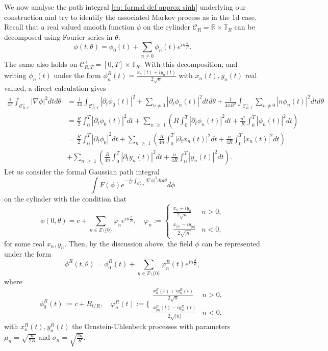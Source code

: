 \documentclass[11pt]{amsart}
\numberwithin{equation}{section}
\theoremstyle{definition}
\renewcommand{\geq}{\;\geqslant\;}                   %
\newcommand{\R}{\mathbb{R}}
\newcommand{\Z}{\mathbb{Z}}
\newcommand{\pl}{\partial}
\newcommand{\mc}{\mathcal}
\def\T{\mathbb{T}}
\begin{document}
We now analyse the path integral \eqref{eq: formal def approx sinh} underlying our construction and try to identify the associated Markov process as in the 1d case. Recall that a real valued smooth function $\phi$ on the cylinder $\mc{C}_R=\R\times \T_R$ can be decomposed using Fourier series in $\theta$:
\begin{equation}
\phi(t, \theta)= \phi_0(t)+ \sum_{n \not = 0} \phi_{n}(t) e^{i n \frac{\theta}{R}}. 
\end{equation}
The same also holds on $\mc{C}^+_{R,T}=[0,T]\times \T_R$. 
With this decomposition, and writing $\phi_{n}(t)$ under the form $\phi^R_{n}(t) = \frac{x_n(t)+i y_n(t)}{2 \sqrt{n}}$ with $x_n(t),y_n(t)$ real valued, a direct calculation gives
\begin{align*}
\frac {1} {4 \pi} \int_{\mc{C}^+_{R,T}}  |\nabla \phi|^2 dtd\theta & =   \frac {1} {4 \pi}   \int_{\mc{C}^+_{R,T}}  |\pl_t\phi_0(t)|^2 + \sum_{n \not = 0} |\pl_t \phi_{n}(t)|^2 dt d\theta +  \frac {1} {4 \pi R^2}  \int_{\mc{C}^+_{R,T}}   \sum_{n \not = 0}  |n \phi_n(t)|^2 dt d\theta \\
& = \frac {R} {2}   \int_{0}^T  |\pl_t\phi_0(t)|^2 dt +  \sum_{n \geq 1} \left ( R  \int_{0}^T   |\pl_t\phi_n(t)|^2 dt  
+  \frac{n^2}{R} \int_{0}^T  |\phi_n(t)|^2 dt \right )\\
& =  \frac {R} {2}   \int_{0}^T  |\pl_t\phi_0|^2 dt +\sum_{n \geq 1} \left (\frac{R}{4 n}  \int_{0}^T   |\pl_tx_n(t)  |^2 dt  +    \frac{n}{4R} \int_{0}^T     |  x_n(t) |^2 dt \right )  \\
& +\sum_{n \geq 1} \left ( \frac {R} {4n} \int_{0}^T   |\pl_t y_n(t)|^2 dt  +  \frac{ n }{4R}  \int_{0}^T  |  y_n(t) |^2 dt \right ).
\end{align*}
Let us consider the formal Gaussian path integral 
\[ \int F(\phi)e^{-\frac{1}{4\pi} \int_{\mc{C}^+_{R,T}}  |\nabla \phi|^2dtd\theta}d\phi\]
on the cylinder with the condition that 
\[\phi(0,\theta)=c+\sum_{n\in \Z\setminus \{0\}}\varphi_ne^{in\frac{\theta}{R}}, \quad 
\varphi_n:=\left\{\begin{array}{ll}
\frac{x_n+iy_n}{2\sqrt{n}} & n>0,\\
\frac{x_{|n|}-iy_{|n|}}{2\sqrt{|n|}} & n<0,
\end{array}\right.\]
for some real $x_n,y_n$. Then, by the discussion above,
the field $\phi$ can be represented under the form 
\[ \phi^R(t,\theta)=\phi_0^R(t)+\sum_{n\in \Z\setminus \{0\}}\varphi_n^R(t)e^{in\frac{\theta}{R}},\] 
where 
\[\phi_0^R(t):=c+B_{t/R}, \quad  \varphi^R_n(t):=\Bigg\{\begin{array}{ll}
\frac{x_n^R(t)+iy_n^R(t)}{2\sqrt{n}} & n>0,\\
\frac{x_{|n|}^{R}(t)-iy^R_{|n|}(t)}{2\sqrt{|n|}} & n<0,
\end{array}\]
with $x_n^R(t),y_n^R(t)$ the Ornstein-Uhlenbeck processes with parameters $\mu_n= \sqrt{\frac{n}{2R}}$ and $\sigma_n=\sqrt{\frac{2n}{R}}$.
\end{document}
